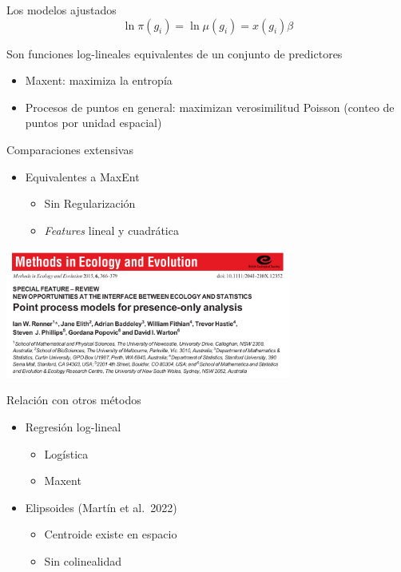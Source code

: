 \documentclass[
  11pt,
  ignorenonframetext,
]{beamer}
\providecommand{\tightlist}{%
  \setlength{\itemsep}{0pt}\setlength{\parskip}{0pt}}
\begin{document}
\begin{frame}{Los modelos ajustados}
\protect\hypertarget{los-modelos-ajustados}{}
\[\ln \pi(g_i ) = \ln \mu(g_i ) = x(g_i) \beta\]

Son funciones log-lineales equivalentes de un conjunto de predictores

\begin{itemize}
\item
  Maxent: maximiza la entropía
\item
  Procesos de puntos en general: maximizan verosimilitud Poisson (conteo
  de puntos por unidad espacial)
\end{itemize}
\end{frame}

\begin{frame}{Comparaciones extensivas}
\protect\hypertarget{comparaciones-extensivas}{}
\begin{itemize}
\item
  Equivalentes a MaxEnt

  \begin{itemize}
  \tightlist
  \item
    Sin Regularización
  \item
    \emph{Features} lineal y cuadrática
  \end{itemize}
\end{itemize}

\includegraphics[width=3.69in]{Figuras/Renner}
\end{frame}

\begin{frame}{Relación con otros métodos}
\protect\hypertarget{relaciuxf3n-con-otros-muxe9todos}{}
\begin{itemize}
\item
  Regresión log-lineal

  \begin{itemize}
  \tightlist
  \item
    Logística
  \item
    Maxent
  \end{itemize}
\item
  Elipsoides (Martín et al.~2022)

  \begin{itemize}
  \tightlist
  \item
    Centroide existe en espacio
  \item
    Sin colinealidad
  \end{itemize}
\end{itemize}
\end{frame}
\end{document}
